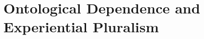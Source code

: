 \documentclass[12pt]{article}
\begin{document}

\section{Ontological Dependence and Experiential Pluralism} %
\label{sec:ontological_dependence_and_experiential_pluralism}



 
 
\end{document}
